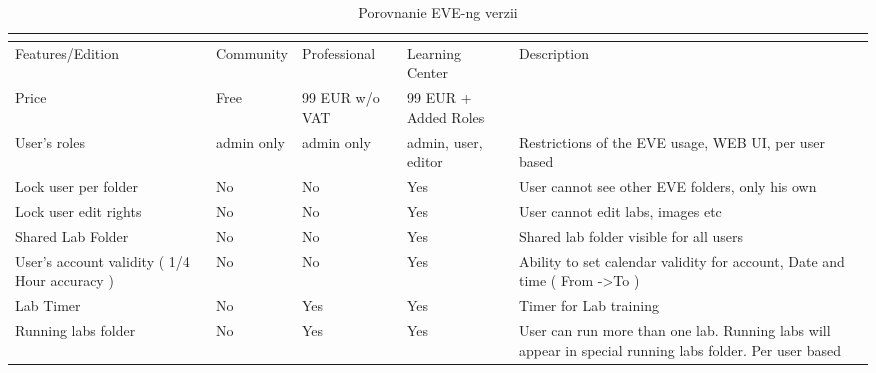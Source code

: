 \begin{longtable}{| m{3cm} | m{2cm} | m{2cm} | m{2cm} | m{4cm} |}
\caption{Porovnanie EVE-ng verzii}
\cite{eve_ng_versions_table}
\label{tab:eve_ng_versions} \\
\hline
Features/Edition                                      & Community         & Professional    & Learning Center      & Description                                                                                                   \\ \hline
Price                                                 & Free              & 99 EUR w/o VAT  & 99 EUR + Added Roles &                                                                                                               \\ \hline
User's roles                                          & admin only        & admin only      & admin, user, editor  & Restrictions of the EVE usage, WEB UI, per user based                                                         \\ \hline
Lock user per folder                                  & No                & No              & Yes                  & User cannot see other EVE folders, only his own                                                               \\ \hline
Lock user edit rights                                 & No                & No              & Yes                  & User cannot edit labs, images etc                                                                             \\ \hline
Shared Lab Folder                                     & No                & No              & Yes                  & Shared lab folder visible for all users                                                                       \\ \hline
User's account validity ( 1/4 Hour accuracy )         & No                & No              & Yes                  & Ability to set calendar validity for account, Date and time ( From -\textgreater To )                         \\ \hline
Lab Timer                                             & No                & Yes             & Yes                  & Timer for Lab training                                                                                        \\ \hline
Running labs folder                                   & No                & Yes             & Yes                  & User can run more than one lab. Running labs will appear in special running labs folder. Per user based       \\ \hline

\end{longtable}
